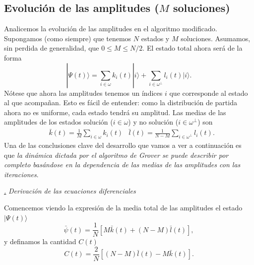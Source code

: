 \documentclass[a4paper,11pt]{book} %
\numberwithin{equation}{chapter}
\def\lc{\left[}
\def\rc{\right]}
\def\subsubiContadorIt{\par\addtocounter{subsubsection}{1}\underline{\it\thesubsubsection.}\hskip0.5cm \setcounter{subsubsubsectionIt}{0}}
\newcommand{\SubsubiIt}[1]{
		\subsubiContadorIt \textit{#1}
	}
\newcounter{subsubsubsectionIt}[subsubsection]
\begin{document}
\subsection{Evolución de las amplitudes ($M$ soluciones)} \label{sec_sec_subsec_prop-no-uni_ecuaciones-diff}

Analicemos la evolución de las amplitudes en el algoritmo modificado. Supongamos (como siempre) que tenemos $N$ estados y $M$ soluciones. Asumamos, sin perdida de generalidad, que $0 \leq M \leq N/2$. El estado total ahora será de la forma
\begin{equation} \label{ec_prob-no-uni_phi-j}
\boxed{|\Psi(t) \rangle = \sum_{i \in \omega} k_i(t) |i \rangle + \sum_{i \in \omega^\perp} l_i(t) |i \rangle }.
\end{equation}
Nótese que ahora las amplitudes tenemos un índices $i$ que corresponde al estado al que acompañan. Esto es fácil de entender: como la distribución de partida ahora no es uniforme, cada estado tendrá su amplitud. Las medias de las amplitudes de los estados solución ($i \in \omega$) y no solución ($i \in \omega^\perp$) son
\begin{equation} \label{ec_prop-no-uni_k-l-mean}
\begin{aligned} 
& \boxed{\bar{k}(t) = \frac{1}{M} \sum_{i \in \omega} k_i(t) }
& \boxed{\bar{l}(t) = \frac{1}{N-M} \sum_{i \in \omega^\perp} l_i(t)}.
\end{aligned}
\end{equation}
Una de las conclusiones clave del desarrollo que vamos a ver a continuación es que \textit{la dinámica dictada por el algoritmo de Grover se puede describir por completo basándose en la dependencia de las medias de las amplitudes con las iteraciones}.

\SubsubiIt{Derivación de las ecuaciones diferenciales} 

Comencemos viendo la expresión de la media total de las amplitudes el estado $|\Psi(t) \rangle$
\begin{equation}
\bar{\psi}(t) = \frac{1}{N} \lc M \bar{k}(t) + (N-M) \bar{l}(t) \rc,
\end{equation}
y definamos la cantidad $C(t)$
\begin{equation}
C(t) = \frac{2}{N} \lc (N-M) \bar{l}(t) - M \bar{k}(t) \rc.
\end{equation}
\end{document}
